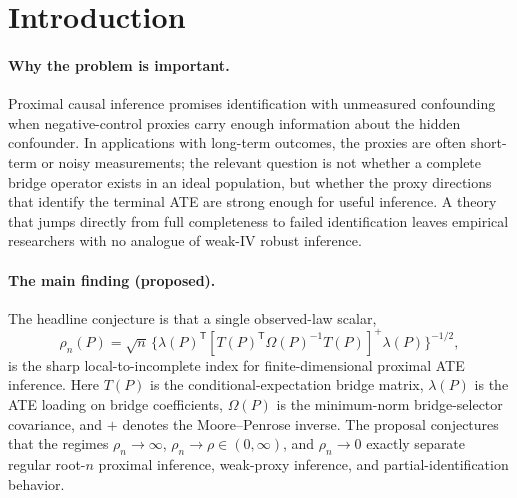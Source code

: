 \documentclass[11pt]{article}
\newcommand{\transpose}{\mathsf{T}}
\theoremstyle{definition}
\theoremstyle{plain}
\theoremstyle{remark}
\begin{document}
\section{Introduction}
\paragraph{Why the problem is important.}
Proximal causal inference promises identification with unmeasured confounding
when negative-control proxies carry enough information about the hidden
confounder.  In applications with long-term outcomes, the proxies are often
short-term or noisy measurements; the relevant question is not whether a
complete bridge operator exists in an ideal population, but whether the proxy
directions that identify the terminal ATE are strong enough for useful
inference.  A theory that jumps directly from full completeness to failed
identification leaves empirical researchers with no analogue of weak-IV
robust inference.

\paragraph{The main finding (proposed).}
The headline conjecture is that a single observed-law scalar,
\[
\rho_n(P)=\sqrt{n}\,\Big\{\lambda(P)^\transpose
[T(P)^\transpose\Omega(P)^{-1}T(P)]^+\lambda(P)\Big\}^{-1/2},
\]
is the sharp local-to-incomplete index for finite-dimensional proximal ATE
inference.  Here $T(P)$ is the conditional-expectation bridge matrix,
$\lambda(P)$ is the ATE loading on bridge coefficients, $\Omega(P)$ is the
minimum-norm bridge-selector covariance, and $+$ denotes the Moore--Penrose
inverse.
The proposal conjectures that the regimes $\rho_n\to\infty$,
$\rho_n\to\rho\in(0,\infty)$, and $\rho_n\to0$ exactly separate regular
root-$n$ proximal inference, weak-proxy inference, and partial-identification
behavior.
\end{document}
